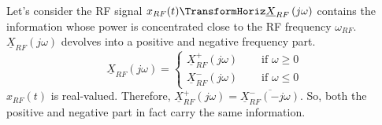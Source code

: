 \begin{refsection}
Let's consider the \ac{RF} signal $x_{RF}(t) \TransformHoriz \underline{X}_{RF}\left(j\omega\right)$ contains the information whose power is concentrated close to the \ac{RF} frequency $\omega_{RF}$. $\underline{X}_{RF}\left(j\omega\right)$ devolves into a positive and negative frequency part.
\begin{equation}
	\underline{X}_{RF}\left(j\omega\right) = \begin{cases}
		\underline{X}_{RF}^{+}\left(j\omega\right) & \quad \text{ if } \omega \geq 0 \\
		\underline{X}_{RF}^{-}\left(j\omega\right) & \quad \text{ if } \omega \leq 0
	\end{cases}
\end{equation}
$x_{RF}(t)$ is real-valued. Therefore, $\underline{X}_{RF}^{+}\left(j\omega\right) = \overline{\underline{X}_{RF}^{-}\left(-j\omega\right)}$. So, both the positive and negative part in fact carry the same information.


\end{refsection}
